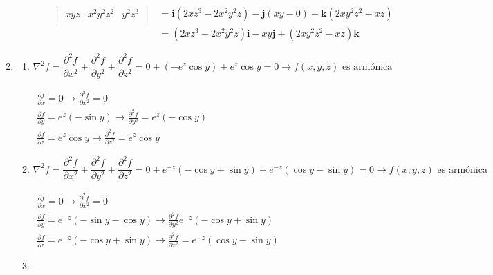 \begin{enumerate}[label=\color{red}\textbf{\arabic*)}]
\begin{enumerate}[label=\color{red}\textbf{\alph*)}]
\begin{enumerate}[label=\arabic*)]
\[\begin{aligned}
\begin{vmatrix}
                    xyz & x^2y^2z^2 & y^2z^3
                  \end{vmatrix} &= \mathbf{i} (2xz^3-2x^2y^2z)-\mathbf{j} (xy-0)+\mathbf{k} (2xy^2z^2-xz)\\
                  &=(2xz^3-2x^2y^2z)\mathbf{i} -xy\mathbf{j} +(2xy^2z^2-xz)\mathbf{k} 
                  \end{aligned}
                  \] 
              \end{enumerate}
    \end{enumerate}
  \item {}
\begin{enumerate}[label=\color{red}\textbf{\alph*)}]
  \item {}

    \[
    \nabla ^2f=\frac{\partial^2 f}{\partial x^2} +\frac{\partial^2 f}{\partial y^2} +\frac{\partial^2 f}{\partial z^2} = 0 + (-e^{z}\cos y )+e^{z}\cos y=0\longrightarrow f(x,y,z)\text{ es armónica} 
    \] 
    
    $\begin{array}{l}
      \frac{\partial f}{\partial x} = 0\longrightarrow \frac{\partial^2 f}{\partial x^2} =0\\
      \frac{\partial f}{\partial y} =e^{z}(-\sin y)\longrightarrow \frac{\partial^2 f}{\partial y^2} =e^{z}(-\cos y)  \\
      \frac{\partial f}{\partial z} =e^{z}\cos y\longrightarrow \frac{\partial^2 f}{\partial z^2} =e^{z} \cos y 
    \end{array}$
  \item {}
    
    \[
    \nabla ^2f=\frac{\partial^2 f}{\partial x^2} +\frac{\partial^2 f}{\partial y^2} +\frac{\partial^2 f}{\partial z^2} = 0 + e^{-z}(-\cos y+\sin y)+e^{-z}(\cos y -\sin y)=0\longrightarrow f(x,y,z)\text{ es armónica }  
    \] 

    $\begin{array}{l}
      \frac{\partial f}{\partial x} =0\longrightarrow \frac{\partial^2 f}{\partial x^2} =0\\
      \frac{\partial f}{\partial y} =e^{-z}(-\sin y-\cos y)\longrightarrow \frac{\partial^2 f}{\partial y^2} e^{-z}(-\cos y + \sin y)\\
      \frac{\partial f}{\partial z} =e^{-z}(-\cos y + \sin y)\longrightarrow \frac{\partial^2 f}{\partial z^2} =e^{-z}(\cos y -\sin y)  
    \end{array}$
  \item {} 


\end{enumerate}
\end{enumerate}
